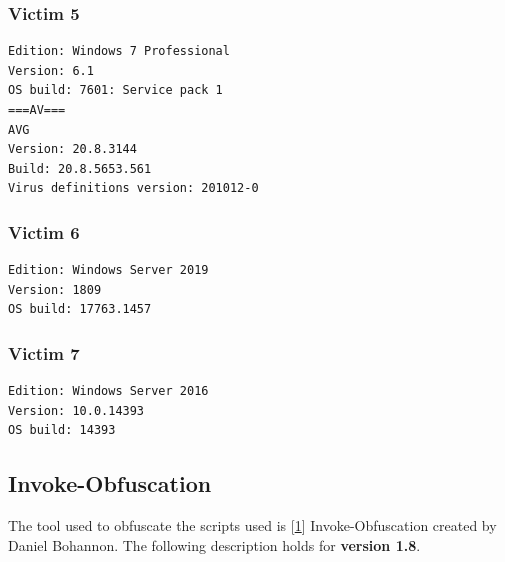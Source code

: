 \documentclass{article}%
\begin{document}
\subsubsection{Victim 5}
\begin{verbatim}
Edition: Windows 7 Professional
Version: 6.1
OS build: 7601: Service pack 1
===AV===
AVG
Version: 20.8.3144
Build: 20.8.5653.561
Virus definitions version: 201012-0
\end{verbatim}
\subsubsection{Victim 6}
\begin{verbatim}
Edition: Windows Server 2019
Version: 1809
OS build: 17763.1457
\end{verbatim}
\subsubsection{Victim 7}
\begin{verbatim}
Edition: Windows Server 2016
Version: 10.0.14393
OS build: 14393
\end{verbatim}
\subsection{Invoke-Obfuscation}
The tool used to obfuscate the scripts used is [\hyperlink{1}{1}] Invoke-Obfuscation created by Daniel Bohannon. The following description holds for \textbf{version 1.8}.
\end{document}
